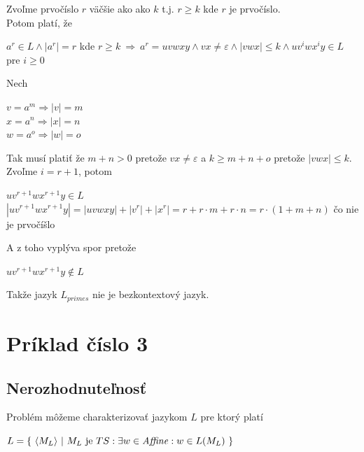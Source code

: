 \documentclass[11pt,a4paper]{article}
\begin{document}
Zvoľme prvočíslo $r$ väčšie ako ako $k$ t.j. $r \geq k$ kde $r$ je prvočíslo.\\

Potom platí, že

\begin{center}
$a^{r} \in L \wedge |a^{r}| = r$ kde $r \geq k \ \Longrightarrow \ a^{r} = uvwxy \wedge vx \neq \varepsilon \wedge |vwx| \leq k \wedge uv^{i}wx^{i}y \in L$ pre $i \geq 0$\\
\end{center}

Nech
\begin{center}
$v = a^{m} \Rightarrow |v| = m$\\
$x = a^{n} \Rightarrow |x| = n$\\
$w = a^{o} \Rightarrow |w| = o$\\
\end{center}

Tak musí platiť že $m+n > 0$ pretože $vx \neq \varepsilon$ a $k \geq m+n+o$ pretože $|vwx| \leq k$.\\

Zvoľme $i=r+1$, potom

\begin{center}
$uv^{r+1}wx^{r+1}y \in L$\\[0.5em]
$|uv^{r+1}wx^{r+1}y| = |uvwxy| + |v^{r}| + |x^{r}| = r + r \cdot m + r \cdot n = r \cdot (1+m+n)$ čo nie je prvočíšlo\\
\end{center}

A z toho vyplýva spor pretože

\begin{center}
$uv^{r+1}wx^{r+1}y \notin L$
\end{center}

Takže jazyk $L_{primes}$ nie je bezkontextový jazyk.

\newpage
\section{Príklad číslo 3} %

\subsection{Nerozhodnuteľnosť}

Problém môžeme charakterizovať jazykom $L$ pre ktorý platí

\begin{center}
    $L = \{ \ \langle M_{L} \rangle \ | \ M_{L} \text{ je } TS: \exists w \in \text{\textit{Affine}}: w \in L(M_{L}) \ \}$
\end{center}
\end{document}
